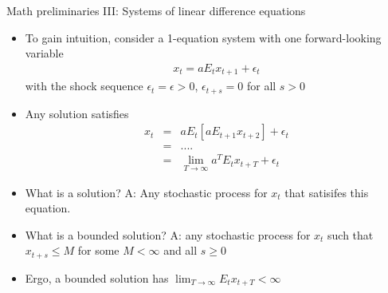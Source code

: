 \documentclass[9pt,xcolor={dvipsnames}]{beamer}
\newcommand{\bit}{\begin{itemize}}
\newcommand{\eit}{\end{itemize}}
\newcommand{\bc}{\color{blue}}
\begin{document}
\begin{frame}{Math preliminaries III: Systems of linear difference equations}

\bit
\setlength\itemsep{1.5em}

\item To gain intuition, consider a 1-equation system with {\bc one forward-looking variable}
\begin{eqnarray}
x_t = a E_t x_{t+1} + \epsilon_t \nonumber
\end{eqnarray}
with the shock sequence $\epsilon_t=\epsilon>0$, $\epsilon_{t+s}=0$ for all $s>0$

\item Any solution satisfies
\begin{eqnarray}
x_t &=& a E_t \left[a E_{t+1} x_{t+2}\right] + \epsilon_t \nonumber \\
&=& .... \nonumber \\
&=& \lim_{T \to \infty} a^T E_t  x_{t+T} + \epsilon_t \nonumber
\end{eqnarray}

\item What is a solution? A: Any stochastic process for $x_t$ that satisifes this equation.

\item What is a {\bc bounded solution}? A: any stochastic process for $x_t$ such that $x_{t+s} \leq M$ for some $M<\infty$ and all $s\geq 0$

\item Ergo, a bounded solution has $\lim_{T \to \infty} E_t  x_{t+T}<\infty$

\eit

\end{frame}
\end{document}
